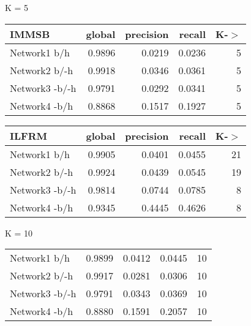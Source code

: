 

\begin{table*}[h] \label{table:unbalanced}
\caption{Predictive Performance on a UnBalanced Testing set}
	\begin{minipage}[h]{0.45\linewidth} 
K = 5\hspace{5pt}
\begin{tabular}{lrrrr}
\hline
 IMMSB   &   global &   precision &   recall &    K-\ensuremath{>} \\
\hline
 Network1 b/h          &   0.9896 &      0.0219 &   0.0236 & 5 \\
 Network2 b/-h       &   0.9918 &      0.0346 &   0.0361 & 5 \\
 Network3 -b/-h      &   0.9791 &      0.0292 &   0.0341 & 5 \\
 Network4 -b/h        &   0.8868 &      0.1517 &   0.1927 & 5 \\
\hline
\end{tabular}
\end{minipage}
\hspace{0.8cm}
\begin{minipage}[h]{0.45\linewidth}
\begin{tabular}{lrrrr}
\hline
 ILFRM    &   global &   precision &   recall &     K-\ensuremath{>} \\
\hline
 Network1 b/h        &   0.9905 &      0.0401 &   0.0455 & 21 \\
 Network2 b/-h     &   0.9924 &      0.0439 &   0.0545 & 19 \\
 Network3 -b/-h    &   0.9814 &      0.0744 &   0.0785 &  8 \\
 Network4 -b/h      &   0.9345 &      0.4445 &   0.4626 &  8 \\
\hline
\end{tabular}
\end{minipage}


	\begin{minipage}[h]{0.45\linewidth} 
K = 10
\begin{tabular}{lrrrr}

 Network1 b/h          &   0.9899 &      0.0412 &   0.0445 & 10 \\
 Network2 b/-h       &   0.9917 &      0.0281 &   0.0306 & 10 \\
 Network3 -b/-h      &   0.9791 &      0.0343 &   0.0369 & 10 \\
 Network4 -b/h        &   0.8880 &      0.1591 &   0.2057 & 10 \\
\hline
\end{tabular}
\end{minipage}
\hspace{0.8cm}
\begin{minipage}[h]{0.45\linewidth}
\begin{tabular}{lrrrr}


\end{tabular}
\end{minipage}
\end{table*}
